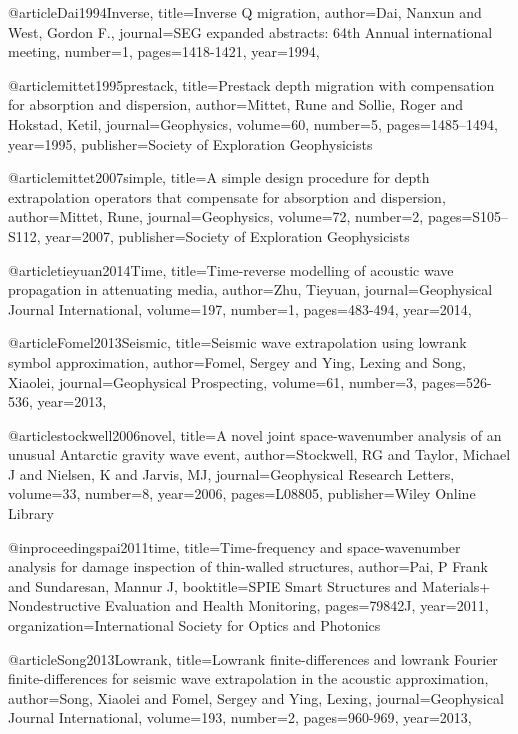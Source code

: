 {@article{Dai1994Inverse,
  title={Inverse {Q} migration},
  author={Dai, Nanxun and West, Gordon F.},
  journal={SEG expanded abstracts: 64th Annual international meeting},
  number={1},
  pages={1418-1421},
  year={1994},
}

@article{mittet1995prestack,
  title={Prestack depth migration with compensation for absorption and dispersion},
  author={Mittet, Rune and Sollie, Roger and Hokstad, Ketil},
  journal={Geophysics},
  volume={60},
  number={5},
  pages={1485--1494},
  year={1995},
  publisher={Society of Exploration Geophysicists}
}

@article{mittet2007simple,
  title={A simple design procedure for depth extrapolation operators that compensate for absorption and dispersion},
  author={Mittet, Rune},
  journal={Geophysics},
  volume={72},
  number={2},
  pages={S105--S112},
  year={2007},
  publisher={Society of Exploration Geophysicists}
}

@article{tieyuan2014Time,
  title={Time-reverse modelling of acoustic wave propagation in attenuating media},
  author={Zhu, Tieyuan},
  journal={Geophysical Journal International},
  volume={197},
  number={1},
  pages={483-494},
  year={2014},
}

@article{Fomel2013Seismic,
  title={Seismic wave extrapolation using lowrank symbol approximation},
  author={Fomel, Sergey and Ying, Lexing and Song, Xiaolei},
  journal={Geophysical Prospecting},
  volume={61},
  number={3},
  pages={526-536},
  year={2013},
}

@article{stockwell2006novel,
  title={A novel joint space-wavenumber analysis of an unusual Antarctic gravity wave event},
  author={Stockwell, RG and Taylor, Michael J and Nielsen, K and Jarvis, MJ},
  journal={Geophysical Research Letters},
  volume={33},
  number={8},
  year={2006},
  pages={L08805},
  publisher={Wiley Online Library}
}

@inproceedings{pai2011time,
  title={Time-frequency and space-wavenumber analysis for damage inspection of thin-walled structures},
  author={Pai, P Frank and Sundaresan, Mannur J},
  booktitle={SPIE Smart Structures and Materials+ Nondestructive Evaluation and Health Monitoring},
  pages={79842J},
  year={2011},
  organization={International Society for Optics and Photonics}
}


@article{Song2013Lowrank,
  title={Lowrank finite-differences and lowrank Fourier finite-differences for seismic wave extrapolation in the acoustic approximation},
  author={Song, Xiaolei and Fomel, Sergey and Ying, Lexing},
  journal={Geophysical Journal International},
  volume={193},
  number={2},
  pages={960-969},
  year={2013},
}

}
